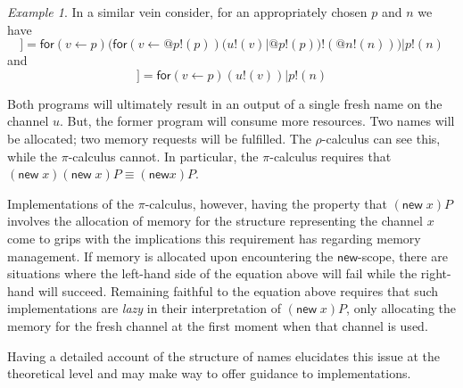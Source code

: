 \documentclass[submission,copyright,creativecommons]{eptcs}
\makeatletter
\newcommand{\pic}{$\pi$-calculus}
\newcommand{\ldb}{[\![}
\newcommand{\rdb}{]\!]}
\newcommand{\quotep}[1]{\mathsf{@}#1}
\newcommand{\meaningof}[1]{\ldb #1 \rdb}
\newcommand{\rhoc}{$\rho$-calculus}
\theoremstyle{definition}
\theoremstyle{remark}
\theoremstyle{remark}
\newtheorem{example}{Example}
\makeatother
\begin{document}
\begin{example}
	In a similar vein consider, for an appropriately chosen $p$ and $n$ we have
	\begin{equation*}
		\meaningof{(\mathsf{new}\;v)(\mathsf{new}\;v) u!(v)} = \mathsf{for}(v \leftarrow p)(\mathsf{for}({v} \leftarrow {\quotep{p!(p)}})(u!(v)|\quotep{p!(p)})!(\quotep{n!(n)})) | p!(n)
	\end{equation*}
	and
	\begin{equation*}
		\meaningof{(\mathsf{new}\;v)u!(v)} = \mathsf{for}(v \leftarrow p)(u!(v) )|p!(n)
	\end{equation*}

	Both programs will ultimately result in an output of a single
	fresh name on the channel $u$. But, the former program will
	consume more resources. Two names will be allocated; two memory
	requests will be fulfilled. The {\rhoc} can see this, while the
	{\pic} cannot. In particular, the {\pic} requires that
	$(\mathsf{new}\;x)(\mathsf{new}\;x)P \equiv (\mathsf{new} x)P$.

	Implementations of the {\pic}, however, having the property that
	$(\mathsf{new}\;x)P$ involves the allocation of memory for the
	structure representing the channel $x$ come to grips with the
	implications this requirement has regarding memory management. If
	memory is allocated upon encountering the $\mathsf{new}$-scope, there are
	situations where the left-hand side of the equation above will
	fail while the right-hand will succeed. Remaining faithful to the
	equation above requires that such implementations are
	\textit{lazy} in their interpretation of $(\mathsf{new}\;x)P$, only
	allocating the memory for the fresh channel at the first moment
	when that channel is used.

	Having a detailed account of the structure of names elucidates
	this issue at the theoretical level and may make way to offer
	guidance to implementations.
\end{example}
\end{document}
